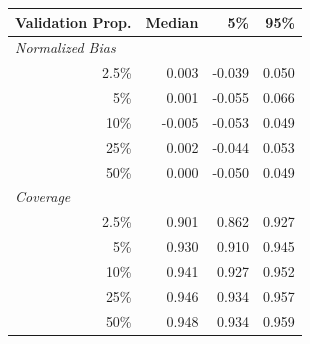 
\begin{tabular}{r|rrr}
\toprule
Validation Prop. & Median & 5\% & 95\%\\
\midrule
\multicolumn{1}{l|}{\textit{Normalized Bias}}\\
2.5\% & 0.003 & -0.039 & 0.050\\
5\% & 0.001 & -0.055 & 0.066\\
10\% & -0.005 & -0.053 & 0.049\\
25\% & 0.002 & -0.044 & 0.053\\
50\% & 0.000 & -0.050 & 0.049\\
\midrule
%
\multicolumn{1}{l|}{\textit{Coverage}}\\
2.5\% & 0.901 & 0.862 & 0.927\\
5\% & 0.930 & 0.910 & 0.945\\
10\% & 0.941 & 0.927 & 0.952\\
25\% & 0.946 & 0.934 & 0.957\\
50\% & 0.948 & 0.934 & 0.959\\
\bottomrule
\end{tabular}
